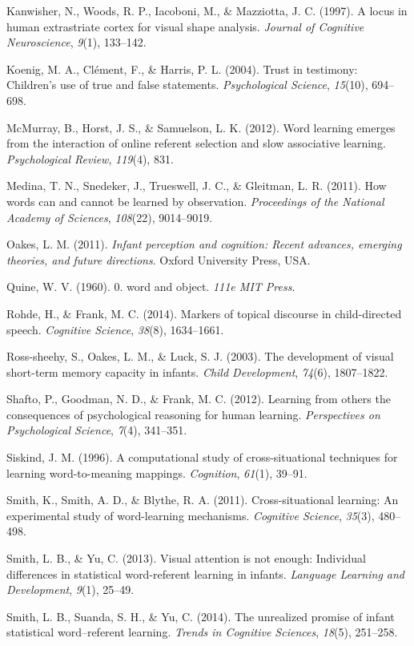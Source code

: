 \documentclass[a4paper,man,natbib]{apa6}
\begin{document}
Kanwisher, N., Woods, R. P., Iacoboni, M., \& Mazziotta, J. C. (1997). A
locus in human extrastriate cortex for visual shape analysis.
\emph{Journal of Cognitive Neuroscience}, \emph{9}(1), 133--142.

Koenig, M. A., Cl{é}ment, F., \& Harris, P. L. (2004). Trust in
testimony: Children's use of true and false statements.
\emph{Psychological Science}, \emph{15}(10), 694--698.

McMurray, B., Horst, J. S., \& Samuelson, L. K. (2012). Word learning
emerges from the interaction of online referent selection and slow
associative learning. \emph{Psychological Review}, \emph{119}(4), 831.

Medina, T. N., Snedeker, J., Trueswell, J. C., \& Gleitman, L. R.
(2011). How words can and cannot be learned by observation.
\emph{Proceedings of the National Academy of Sciences}, \emph{108}(22),
9014--9019.

Oakes, L. M. (2011). \emph{Infant perception and cognition: Recent
advances, emerging theories, and future directions}. Oxford University
Press, USA.

Quine, W. V. (1960). 0. word and object. \emph{111e MIT Press}.

Rohde, H., \& Frank, M. C. (2014). Markers of topical discourse in
child-directed speech. \emph{Cognitive Science}, \emph{38}(8),
1634--1661.

Ross-sheehy, S., Oakes, L. M., \& Luck, S. J. (2003). The development of
visual short-term memory capacity in infants. \emph{Child Development},
\emph{74}(6), 1807--1822.

Shafto, P., Goodman, N. D., \& Frank, M. C. (2012). Learning from others
the consequences of psychological reasoning for human learning.
\emph{Perspectives on Psychological Science}, \emph{7}(4), 341--351.

Siskind, J. M. (1996). A computational study of cross-situational
techniques for learning word-to-meaning mappings. \emph{Cognition},
\emph{61}(1), 39--91.

Smith, K., Smith, A. D., \& Blythe, R. A. (2011). Cross-situational
learning: An experimental study of word-learning mechanisms.
\emph{Cognitive Science}, \emph{35}(3), 480--498.

Smith, L. B., \& Yu, C. (2013). Visual attention is not enough:
Individual differences in statistical word-referent learning in infants.
\emph{Language Learning and Development}, \emph{9}(1), 25--49.

Smith, L. B., Suanda, S. H., \& Yu, C. (2014). The unrealized promise of
infant statistical word--referent learning. \emph{Trends in Cognitive
Sciences}, \emph{18}(5), 251--258.
\end{document}
